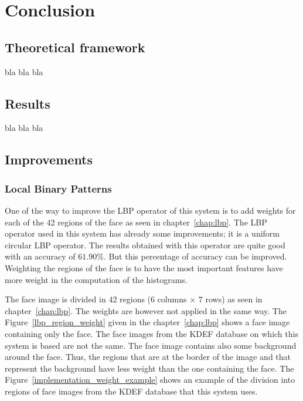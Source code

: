 \chapter{Conclusion}
\label{chap:ccl}
  
\section{Theoretical framework}

\vspace{\baselineskip}
\noindent bla bla bla
\newline

\section{Results}

\vspace{\baselineskip}
\noindent bla bla bla
\newline

\section{Improvements}

\subsection{Local Binary Patterns}

\vspace{\baselineskip}
\noindent One of the way to improve the LBP operator of this system is to add weights for each of the 42 regions of the face as seen in chapter~\ref{chap:lbp}. The LBP operator used in this system has already some improvements; it is a uniform circular LBP operator. The results obtained with this operator are quite good with an accuracy of $ 61.90\% $. But this percentage of accuracy can be improved. Weighting the regions of the face is to have the most important features have more weight in the computation of the histograms.
\newline

\noindent The face image is divided in 42 regions ($ 6 $ columns $ \times $ $ 7 $ rows) as seen in chapter~\ref{chap:lbp}. The weights are however not applied in the same way. The Figure~\ref{lbp_region_weight} given in the chapter~\ref{chap:lbp} shows a face image containing only the face. The face images from the KDEF database on which this system is based are not the same. The face image contains also some background around the face. Thus, the regions that are at the border of the image and that represent the background have less weight than the one containing the face. The Figure~\ref{implementation_weight_example} shows an example of the division into regions of face images from the KDEF database that this system uses.
\newline

